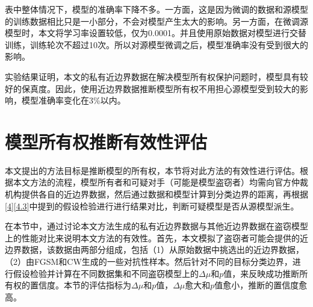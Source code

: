 表中整体情况下，模型的准确率下降不多。一方面，这是因为微调的数据和源模型的训练数据相比只是一小部分，不会对模型产生太大的影响。另一方面，在微调源模型时，本文将学习率设置较低，仅为0.0001。并且使用原始数据对模型进行交替训练，训练轮次不超过10次。所以对源模型微调之后，模型准确率没有受到很大的影响。

实验结果证明，本文的私有近边界数据在解决模型所有权保护问题时，模型具有较好的保真度。因此，使用近边界数据推断模型所有权不用担心源模型受到较大的影响，模型准确率变化在3\%以内。	
	

\section{模型所有权推断有效性评估}\label{5.6}

本文提出的方法目标是推断模型的所有权，本节将对此方法的有效性进行评估。根据本文方法的流程，模型所有者和可疑对手（可能是模型盗窃者）均需向官方仲裁机构提供各自的近边界数据，然后通过数据和模型计算到分类边界的距离，再根据\ref{4}\ref{4.3}中提到的假设检验进行进行结果对比，判断可疑模型是否从源模型派生。

在本节中，通过讨论本文方法生成的私有近边界数据与其他近边界数据在盗窃模型上的性能对比来说明本文方法的有效性。首先，本文模拟了盗窃者可能会提供的近边界数据，该数据由两部分组成，包括（1）从原始数据中挑选出的近边界数据，（2）由FGSM和CW生成的一些对抗性样本。然后针对不同的目标分类边界，进行假设检验并计算在不同数据集和不同盗窃模型上的$\Delta\mu$和$p$值，来反映成功推断所有权的置信度。本节的评估指标为$\Delta\mu$和$p$值，$\Delta\mu$愈大和$p$值愈小，推断的置信度愈高。

